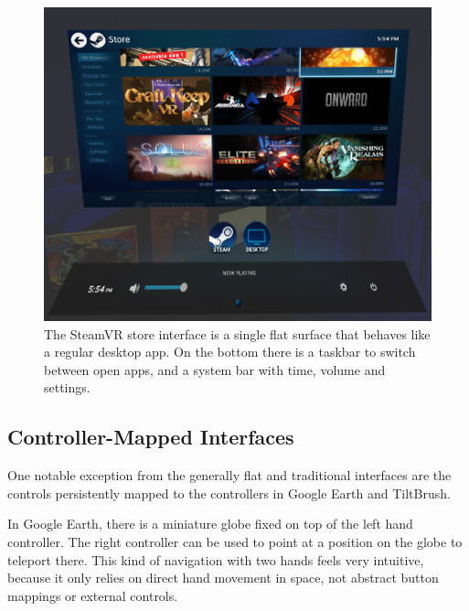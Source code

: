 \documentclass{tufte-book} %
\begin{document}
\begin{figure}
  \includegraphics{steamstore.png}
  \caption{The SteamVR store interface is a single flat surface that behaves like a regular desktop app. On the bottom there is a taskbar to switch between open apps, and a system bar with time, volume and settings.}
  \label{fig:steamstore}
\end{figure}


\subsection{Controller-Mapped Interfaces}
One notable exception from the generally flat and traditional interfaces are the controls persistently mapped to the controllers in Google Earth and TiltBrush.

In Google Earth, there is a miniature globe fixed on top of the left hand controller. The right controller can be used to point at a position on the globe to teleport there. This kind of navigation with two hands feels very intuitive, because it only relies on direct hand movement in space, not abstract button mappings or external controls.
\end{document}
